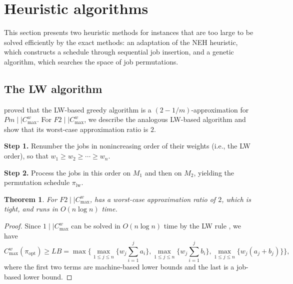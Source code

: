 \documentclass[12pt]{article}
\newtheorem{theorem}{Theorem}[section]
\let\origsection\section
\renewcommand{\section}{\FloatBarrier\origsection}
\begin{document}
\begin{sloppypar}
        
        
        \section{Heuristic algorithms}  \label{Sec-Heu}
        
        This section presents two heuristic methods for instances that are too large to be solved efficiently 
        by the exact methods: an adaptation of the NEH heuristic, which constructs a schedule through sequential job insertion, 
        and a genetic algorithm, which searches the space of job permutations.
        
        
        \subsection{The LW algorithm}  \label{Subsec-LW}
        
        \cite{Sun2024JOCO} proved that the LW-based greedy algorithm is a $(2-1/m)$-approximation for $Pm \mid \mid C_{\max}^w$. For $F2 \mid \mid C_{\max}^w$, we describe the analogous LW-based algorithm and show that its worst-case approximation ratio is $2$.
        
        \begin{algorithm}[H]
            \small
            \linespread{1.2}\selectfont
            \SetAlgoLined
            \DontPrintSemicolon
            \caption{LW's rule for $F2 \mid \mid C_{\max}^w$} \label{Alg-LW}
            \BlankLine
            \textbf{Step 1.} Renumber the jobs in nonincreasing order of their weights (i.e., the LW order), so that $w_1 \geq w_2 \geq \cdots \geq w_n$. \;
            
            \textbf{Step 2.} Process the jobs in this order on $M_1$ and then on $M_2$, yielding the permutation schedule $\pi_{\mathrm{lw}}$. \;
            
        \end{algorithm}
        
        \begin{theorem}\label{Thm-LW}
            For $F2 \mid \mid C_{\max}^w$,  has a worst-case approximation ratio of $2$, which is tight, and runs in $O(n\log n)$ time.
        \end{theorem}
        
        \begin{proof}
            Since $1 \mid \mid C_{\max}^w$ can be solved in $O(n\log n)$ time by the LW rule \citep{NongChengNg2011EJOR}, we have
            \begin{equation}\label{Eq-LB}
                C_{\max}^w(\pi_{\mathrm{opt}}) \geq LB=\max \Big \{\max_{1 \leq j \leq n} \Big\{w_j \sum_{i=1}^j a_i \Big\}, \max_{1 \leq j \leq n} \Big\{w_j \sum_{i=1}^j b_i\Big\}, \max_{1 \leq j \leq n} \Big\{w_j (a_j+b_j)\Big\} \Big\},
            \end{equation}
            where the first two terms are machine-based lower bounds and the last is a job-based lower bound.   
            

\end{proof}
\end{sloppypar}
\end{document}
